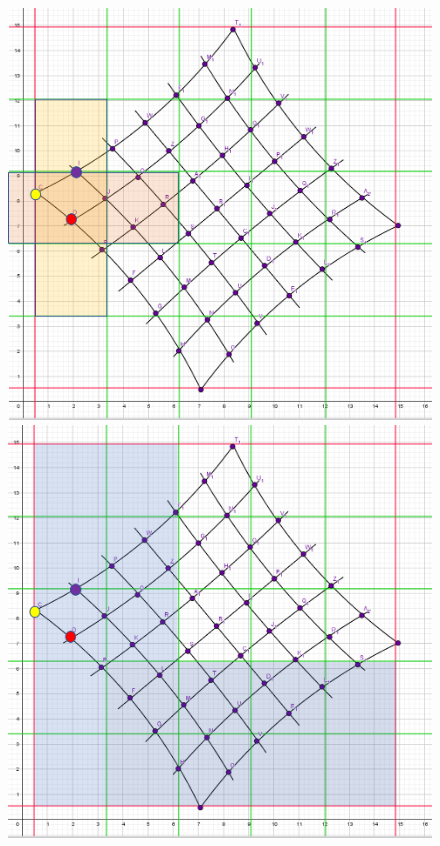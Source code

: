 \begin{figure}[!htb]
	\includegraphics[width=\linewidth]{images/VerzeichnetesSchachbrett_2.png}
	\caption{}
	\label{fig:awesome_image1}
	\endminipage\hfill
	\includegraphics[width=\linewidth]{images/VerzeichnetesSchachbrett_3.png}
	\caption{}
	\label{fig:awesome_image2}
	\endminipage\hfill
\end{figure}

